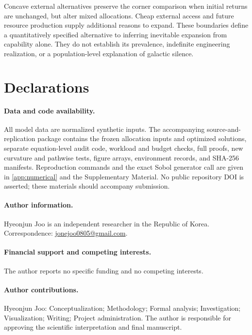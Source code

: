 Concave external alternatives preserve the corner comparison when initial
returns are unchanged, but alter mixed allocations. Cheap external access
and future resource production supply additional reasons to expand.
These boundaries define a quantitatively specified alternative to
inferring inevitable expansion from capability alone.
They do not establish its prevalence, indefinite engineering realization,
or a population-level explanation of galactic silence.

\section*{Declarations}

\paragraph{Data and code availability.} All model data are normalized synthetic inputs. The accompanying source-and-replication package contains the frozen allocation inputs and optimized solutions, separate equation-level audit code, workload and budget checks, full proofs, new curvature and pathwise tests, figure arrays, environment records, and SHA-256 manifests. Reproduction commands and the exact Sobol generator call are given in \cref{app:numerical} and the Supplementary Material. No public repository DOI is asserted; these materials should accompany submission.

\paragraph{Author information.} Hyeonjun Joo is an independent researcher in the Republic of Korea. Correspondence: \href{mailto:jonejoo0805@gmail.com}{jonejoo0805@gmail.com}.

\paragraph{Financial support and competing interests.} The author reports no specific funding and no competing interests.

\paragraph{Author contributions.} Hyeonjun Joo: Conceptualization; Methodology; Formal analysis; Investigation; Visualization; Writing; Project administration. The author is responsible for approving the scientific interpretation and final manuscript.

